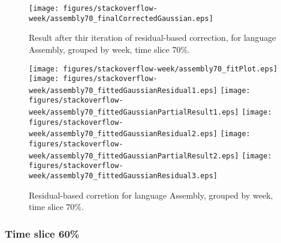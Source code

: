 \begin{figure}[]
\centering
{\texttt{[image: figures/stackoverflow-week/assembly70\_finalCorrectedGaussian.eps]}}
\caption{Result after thir iteration of residual-based correction, for language Assembly, grouped by week, time slice 70\%.}
\end{figure}


\begin{figure}[hb]
\centering
{}
{\texttt{[image: figures/stackoverflow-week/assembly70\_fitPlot.eps]}}
{\texttt{[image: figures/stackoverflow-week/assembly70\_fittedGaussianResidual1.eps]}}
{\texttt{[image: figures/stackoverflow-week/assembly70\_fittedGaussianPartialResult1.eps]}}
{\texttt{[image: figures/stackoverflow-week/assembly70\_fittedGaussianResidual2.eps]}}
{\texttt{[image: figures/stackoverflow-week/assembly70\_fittedGaussianPartialResult2.eps]}}
{\texttt{[image: figures/stackoverflow-week/assembly70\_fittedGaussianResidual3.eps]}}
\caption{Residual-based corretion for language Assembly, grouped by week, time slice 70\%.}
\end{figure}


\clearpage 
\newpage 


\FloatBarrier

\subsubsection{Time slice 60\%}

